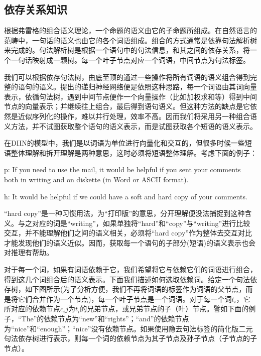 \documentclass[UTF8,11pt,a4paper,nofonts]{ctexart}
\begin{document}
\subsection{依存关系知识}

根据弗雷格的组合语义理论\cite{}，一个命题的语义由它的子命题所组成。在自然语言的范畴中，一句话的语义也由它的各个词语组成。组合的方式通常是依靠句法解析树来完成的。句法解析树是根据一个语句中的句法信息，和其之间的依存关系，将一个一句话映射成一颗树。每一个叶子节点对应一个词语，中间节点为句法标签。

我们可以根据依存句法树，由底至顶的通过一些操作将所有词语的语义组合得到完整的语句的语义。\cite{}提出的递归神经网络便是依照这种思路，每一个词语由其词向量表示，依循句法树，遇到中间节点便作一个向量操作（比如加权求和等）得到中间节点的向量表示；并继续往上组合，最后得到语句语义。但这种方法的缺点是它依然是近似序列化的操作，难以并行处理，效率不高。因而我们将采用另一种组合语义方法，并不试图获取整个语句的语义表示，而是试图获取各个短语的语义表示。

在DIIN的模型中，我们是以词语为单位进行向量化和交互的，但很多时候一些短语整体理解和拆开理解是两种意思，这时必须将短语整体理解。考虑下面的例子：


p: If you need to use the mail, it would be helpful if you sent your comments both in writing and on diskette (in Word or ASCII format).

h: It would be helpful if we could have a soft and hard copy of your comments.

“hard copy”是一种习惯用法，为“打印版”的意思，分开理解便没法捕捉到这种含义。与之对应的词是“writing”，如果单独将“hard”和“copy”与“writing”进行比较交互，并不能理解他们之间的语义相关，必须将“hard copy”作为整体去交互对比才能发现他们的语义近似。因而，获取每一个语句的子部分(短语)的语义表示也会对推理有帮助。


对于每一个词，如果有词语依赖于它，我们希望将它与依赖它们的词语进行组合，得到这几个词组合后的语义表示。下面我们描述如何选取依赖词。给定一个句法依存树，如下图所示(为了分析方便，我们不再将词语的标签作为词语的父节点，而是将它们合并作为一个节点)，每一个叶子节点是一个词语。对于每一个词$t_i$，它所对应的依赖节点$c_ij$为$t_i$的兄弟节点，或兄弟节点的子（叶）节点。譬如下面的例子，“The”的依赖节点为“new”和“rights”；“and”的依赖节点为“nice”和“enough”；“nice”没有依赖节点。如果使用隐去句法标签的简化版二元句法依存树进行表示，则每一个词的依赖节点为其子节点及孙子节点（子节点的子节点）。
\end{document}
